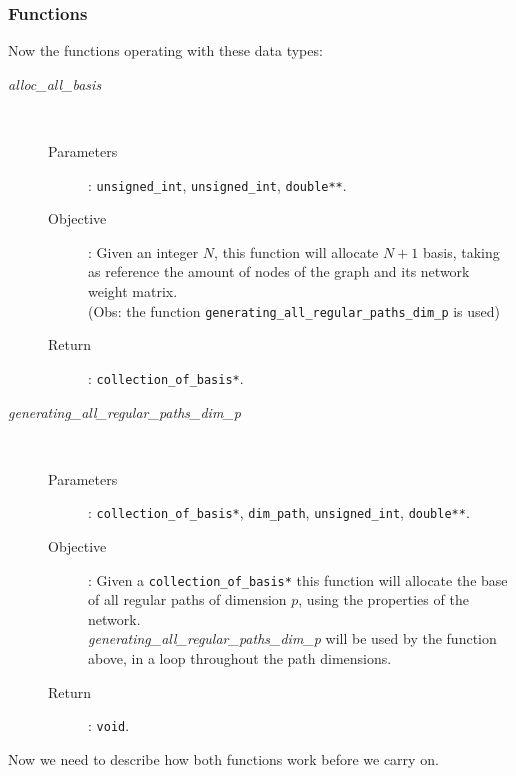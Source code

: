 \documentclass[11pt,a4paper]{article}
\begin{document}
\subsubsection{Functions}
Now the functions operating with these data types:
\begin{description}
	\item [\textit{alloc\_all\_basis}] \hfill \\[-0.5cm]
		\begin{description}
			\item [Parameters]: \texttt{unsigned\_int}, \texttt{unsigned\_int}, \texttt{double**}.
			\item [Objective]: Given an integer $N$, this function will allocate
				$N+1$ basis, taking as reference the amount of nodes of 
				the graph and its network weight matrix.\\
				(Obs: the function
				\texttt{generating\_all\_regular\_paths\_dim\_p} is used)
			\item [Return]: \texttt{collection\_of\_basis*}.
		\end{description}

	\item [\textit{generating\_all\_regular\_paths\_dim\_p}] \hfill \\[-0.5cm]
		\begin{description}
			\item [Parameters]: \texttt{collection\_of\_basis*}, \texttt{dim\_path}, \texttt{unsigned\_int},
				\texttt{double**}.
			\item [Objective]: Given a \texttt{collection\_of\_basis*} this function
				will allocate the base of all regular paths of dimension
				$p$, using the properties of the network.\\
				\textit{generating\_all\_regular\_paths\_dim\_p}
				will be used by the function above, in a loop
				throughout the path dimensions.
			\item [Return]: \texttt{void}.
		\end{description}
\end{description}
Now we need to describe how both functions work before we carry on.


\end{document}
